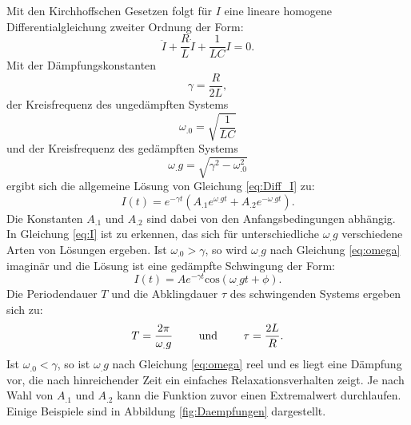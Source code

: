 \noindent Mit den Kirchhoffschen Gesetzen folgt für $I$ eine lineare homogene Differentialgleichung zweiter Ordnung der Form:
\begin{equation}
\ddot{I} + \frac{R}{L} \dot{I} + \frac{1}{LC}I = 0\text{.} \label{eq:Diff_I}
\end{equation}
Mit der Dämpfungskonstanten
\begin{equation}
\gamma=\frac{R}{2L},\label{eq:gamma}
\end{equation}
der Kreisfrequenz des ungedämpften Systems
\[
\omega_.0 = \sqrt{\frac{1}{LC}}
\]
und der Kreisfrequenz des gedämpften Systems
\begin{equation}
\omega_.g=\sqrt{\gamma^2-\omega_.0^2}\label{eq:omega}
\end{equation}
ergibt sich die allgemeine Lösung von Gleichung \eqref{eq:Diff_I} zu:
\begin{equation}
I(t) = e^{-\gamma t}\left(A_.1e^{\omega_.g t}+A_.2e^{-\omega_.g t}\right)\text{.} \label{eq:I}
\end{equation}
Die Konstanten $A_.1$ und $A_.2$ sind dabei von den Anfangsbedingungen abhängig.
In Gleichung \eqref{eq:I} ist zu erkennen, das sich für unterschiedliche $\omega_.g$ verschiedene Arten von Lösungen ergeben.\newline
Ist $\omega_.0>\gamma$, so wird $\omega_.g$ nach Gleichung \eqref{eq:omega} imaginär und die Lösung ist eine gedämpfte Schwingung der Form:
\begin{equation}
I(t) = A e^{-\gamma t} \mathrm{cos}(\omega_.g t + \phi)\text{.} \label{eq:I2}
\end{equation}
Die Periodendauer $T$ und die Abklingdauer $\tau$ des schwingenden Systems ergeben sich zu:
\begin{equation}
T = \frac{2\pi}{\omega_.g} \text{\hspace{2em} und \hspace{2em}} \tau = \frac{2L}{R}\text{.}\label{eq:tau}
\end{equation}
Ist $\omega_.0<\gamma$, so ist $\omega_.g$ nach Gleichung \eqref{eq:omega} reel und es liegt eine Dämpfung vor, die nach hinreichender Zeit ein einfaches Relaxationsverhalten zeigt. Je nach Wahl von $A_.1$ und $A_.2$ kann die Funktion zuvor einen Extremalwert durchlaufen. Einige Beispiele sind in Abbildung \ref{fig:Daempfungen} dargestellt.

